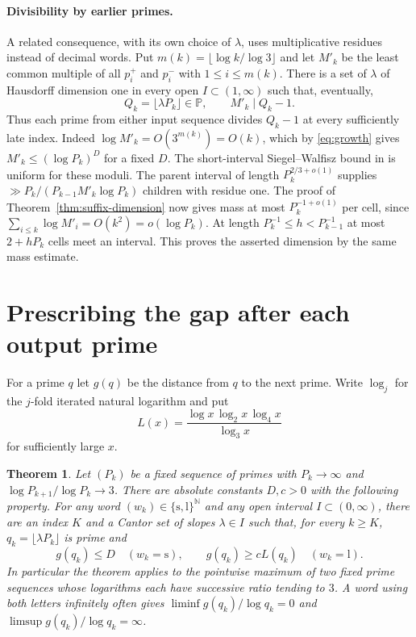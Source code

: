 \documentclass[11pt]{article}
\newtheorem{theorem}{Theorem}
\theoremstyle{remark}\newtheorem*{remark}{Remark}
\newcommand{\PP}{\mathbb P}
\begin{document}
\paragraph{Divisibility by earlier primes.}
A related consequence, with its own choice of $\lambda$, uses
multiplicative residues instead of decimal words. Put
$m(k)=\lfloor\log k/\log 3\rfloor$ and let $M'_k$ be the least common
multiple of all $p_i^+$ and $p_i^-$ with $1\le i\le m(k)$.
There is a set of $\lambda$ of Hausdorff dimension one in every open
$I\subset(1,\infty)$ such that, eventually,
\[
 Q_k=\lfloor\lambda P_k\rfloor\in\PP,\qquad M'_k\mid Q_k-1 .
\]
Thus each prime from either input sequence divides $Q_k-1$ at every
sufficiently late index. Indeed $\log M'_k=O(3^{m(k)})=O(k)$, which
by \eqref{eq:growth} gives $M'_k\le(\log P_k)^D$ for a fixed $D$.
The short-interval Siegel--Walfisz bound in \cite[p.~3 of the preprint]{tz}
is uniform for these moduli. The parent interval of length
$P_k^{2/3+o(1)}$ supplies $\gg P_k/(P_{k-1}M'_k\log P_k)$ children
with residue one. The proof of Theorem~\ref{thm:suffix-dimension} now
gives mass at most $P_k^{-1+o(1)}$ per cell, since
$\sum_{i\le k}\log M'_i=O(k^2)=o(\log P_k)$.
At length $P_k^{-1}\le h<P_{k-1}^{-1}$ at most $2+hP_k$ cells meet an
interval. This proves the asserted dimension by the same mass estimate.
\section{Prescribing the gap after each output prime}\label{sec:gaps}
For a prime $q$ let $g(q)$ be the distance from $q$ to the next prime.
Write $\log_j$ for the $j$-fold iterated natural logarithm and put
\[
  L(x)=\frac{\log x\,\log_2 x\,\log_4 x}{\log_3 x}
\]
for sufficiently large $x$.

\begin{theorem}
Let $(P_k)$ be a fixed sequence of primes with
$P_k\to\infty$ and $\log P_{k+1}/\log P_k\to3$.
There are absolute constants $D,c>0$ with the following property.
For any word $(w_k)\in\{\mathrm{s},\mathrm{l}\}^{\mathbb N}$
and any open interval $I\subset(0,\infty)$, there are an index
$K$ and a Cantor set of slopes $\lambda\in I$ such that, for every
$k\ge K$, $q_k=\lfloor\lambda P_k\rfloor$ is prime and
\[
 g(q_k)\le D\quad(w_k=\mathrm{s}),\qquad
 g(q_k)\ge cL(q_k)\quad(w_k=\mathrm{l}).
\]
In particular the theorem applies to the pointwise maximum
of two fixed prime sequences whose logarithms each have successive
ratio tending to $3$. A word using both letters infinitely often
gives $\liminf g(q_k)/\log q_k=0$ and
$\limsup g(q_k)/\log q_k=\infty$.
\end{theorem}
\end{document}
